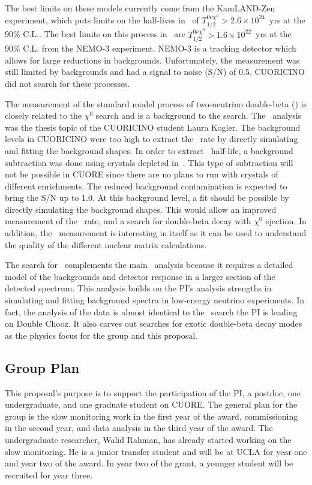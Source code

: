 The best limits on these models currently come from the KamLAND-Zen experiment, which puts limits on the half-lives in \isoxe~of $T_{1/2}^{0\nu\chi^0}>2.6\times10^{24}$~yrs at the 90\% C.L.\cite{KZMaj}. The best limits on this process in \isomain~are $T_{1/2}^{0\nu\chi^0}>1.6\times10^{22}$~yrs at the 90\% C.L. from the NEMO-3 experiment\cite{nemo3Te}. NEMO-3 is a tracking detector which allows for large reductions in backgrounds. Unfortunately, the measurement was still limited by backgrounds and had a signal to noise (S/N) of 0.5. CUORICINO did not search for these processes.

The measurement of the standard model process of two-neutrino double-beta (\twonu) is closely related to the $\chi^{0}$ search and is a background to the search. The \twonu~analysis was the thesis topic of the CUORICINO student Laura Kogler\cite{laura}. The background levels in CUORICINO were too high to extract the \twonu~rate by directly simulating and fitting the background shapes. In order to extract \twonu~half-life, a background subtraction was done using crystals depleted in~\isomain. This type of subtraction will not be possible in CUORE since there are no plans to run with crystals of different enrichments. The reduced background contamination is expected to bring the S/N up to 1.0. At this background level, a fit should be possible by directly simulating the background shapes. This would allow an improved measurement of the \twonu~rate, and a search for double-beta decay with $\chi^{0}$ ejection. In addition, the \twonu~measurement is interesting in itself as it can be used to understand the quality of the different nuclear matrix calculations. 

The search for \maj~complements the main \zeronu~analysis because it requires a detailed model of the backgrounds and detector response in a larger section of the detected spectrum. This analysis builds on the PI's analysis strengths in simulating and fitting background spectra in low-energy neutrino experiments. In fact, the analysis of the data is almost identical to the \zeronu~search the PI is leading on Double Chooz. It also carves out searches for exotic double-beta decay modes as the physics focus for the group and this proposal.


\subsection{Group Plan}
This proposal's purpose is to support the participation of the PI, a postdoc, one undergraduate, and one graduate student on CUORE. The general plan for the group is the slow monitoring work in the first year of the award, commissioning in the second year, and data analysis in the third year of the award. The undergraduate researcher, Walid Rahman, has already started working on the slow monitoring. He is a junior transfer student and will be at UCLA for year one and year two of the award. In year two of the grant, a younger student will be recruited for year three. 

